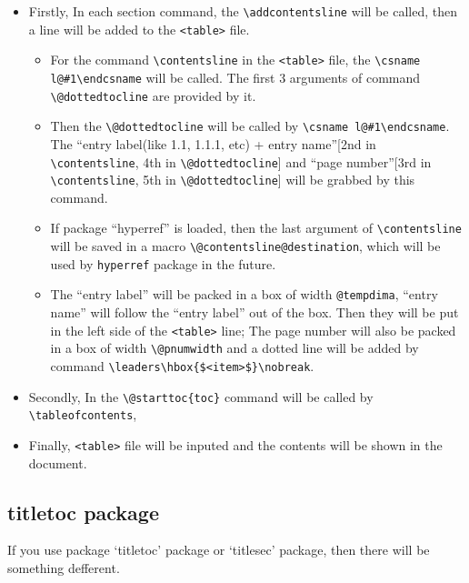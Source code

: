 \documentclass{article}
\begin{document}
\begin{itemize}
  \item Firstly, In each section command, the \verb|\addcontentsline| will be called, then a line will be added to the \verb|<table>| file.
    \begin{itemize}
      \item For the command \verb|\contentsline| in the \verb|<table>| file, the \verb|\csname l@#1\endcsname| will be called. The first 3 arguments 
        of command \verb|\@dottedtocline| are provided by it.
      \item Then the \verb|\@dottedtocline| will be called by \verb|\csname l@#1\endcsname|. The ``entry label(like 1.1, 1.1.1, etc) +
        entry name''[{\color{gray}2nd in \verb|\contentsline|, 4th in \verb|\@dottedtocline|}] and ``page number''[{\color{gray}3rd in \verb|\contentsline|, 5th in \verb|\@dottedtocline|}]
        will be grabbed by this command. 
      \item If package ``hyperref'' is loaded, then the last argument of \verb|\contentsline| will be saved in a macro \verb|\@contentsline@destination|, 
        which will be used by \verb|hyperref| package in the future.
      \item The ``entry label'' will be packed in a box of width \verb|@tempdima|, ``entry name'' will follow the ``entry label'' out of the box. 
        Then they will be put in the left side of the \verb|<table>| line; The page number will also be packed in a box of width \verb|\@pnumwidth| and a dotted line will be 
        added by command \verb|\leaders\hbox{$<item>$}\nobreak|.
    \end{itemize}
  \item Secondly, In the \verb|\@starttoc{toc}| command will be called by \verb|\tableofcontents|, 
  \item Finally, \verb|<table>| file will be inputed and the contents will be shown in the document.
\end{itemize}


\subsection{titletoc package}
If you use package `titletoc' package or `titlesec' package, then there will be something defferent.
\end{document}
